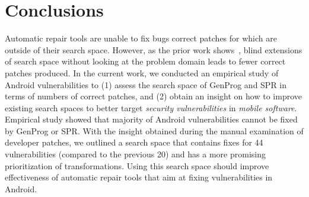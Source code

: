 \newpage

\section{Conclusions}
\label{section:conclusion}

Automatic repair tools are unable to fix bugs correct patches for which are outside of their search space. However, as the prior work shows~\cite{long2016analysis}, blind extensions of search space without looking at the problem domain leads to fewer correct patches produced. In the current work, we conducted an empirical study of \numvuln Android vulnerabilities to (1) assess the search space of GenProg and SPR in terms of numbers of correct patches, and (2) obtain an insight on how to improve existing search spaces to better target \emph{security vulnerabilities} in \emph{mobile software}. Empirical study showed that majority of Android vulnerabilities cannot be fixed by GenProg or SPR. With the insight obtained during the manual examination of developer patches, we outlined a search space that contains fixes for 44 vulnerabilities (compared to the previous 20) and has a more promising prioritization of transformations. Using this search space should improve effectiveness of automatic repair tools that aim at fixing vulnerabilities in Android.
